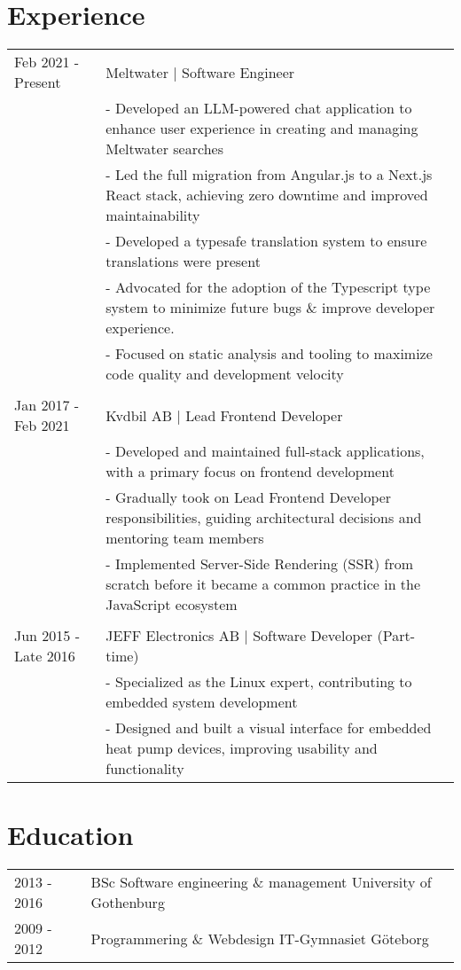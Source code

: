 \documentclass[11pt, letterpaper]{article}
\begin{document}
\section{Experience}
\color{black}
\begin{tabularx}{\textwidth}{p{1.6in} X}
  Feb 2021 - Present & Meltwater | Software Engineer\\[1ex]
                     & - Developed an LLM-powered chat application to enhance user experience in creating and managing Meltwater searches\\
                     & - Led the full migration from Angular.js to a Next.js React stack, achieving zero downtime and improved maintainability\\
                     & - Developed a typesafe translation system to ensure translations were present\\
                     & - Advocated for the adoption of the Typescript type system to minimize future bugs \& improve developer experience.\\
                     & - Focused on static analysis and tooling to maximize code quality and development velocity\\\\

  Jan 2017 - Feb 2021 & Kvdbil AB | Lead Frontend Developer\\[1ex]
                      & - Developed and maintained full-stack applications, with a primary focus on frontend development\\
                      & - Gradually took on Lead Frontend Developer responsibilities, guiding architectural decisions and mentoring team members\\
                      & - Implemented Server-Side Rendering (SSR) from scratch before it became a common practice in the JavaScript ecosystem\\\\

  Jun 2015 - Late 2016 & JEFF Electronics AB | Software Developer (Part-time)\\[1ex]
                       & - Specialized as the Linux expert, contributing to embedded system development\\
                       & - Designed and built a visual interface for embedded heat pump devices, improving usability and functionality\\
\end{tabularx}

\color{GoogleBlue}
\section{Education}
\color{black}
\begin{tabularx}{\textwidth}{p{1.6in} X}
  2013 - 2016 & BSc Software engineering \& management \hfill University of Gothenburg \\[1ex]
  2009 - 2012 & Programmering \& Webdesign \hfill IT-Gymnasiet Göteborg\\
\end{tabularx}
\end{document}
